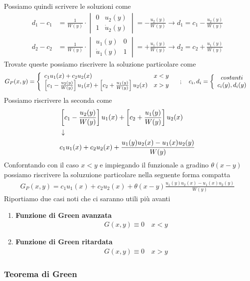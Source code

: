 Possiamo quindi scrivere le soluzioni come
\begin{align}
	d_1 - c_1 &= \frac{1}{W(y)} \cdot \begin{vmatrix}
		0 & u_2(y) \\
		1 & \dot{u}_2(y)
	\end{vmatrix} = -\frac{u_2(y)}{W(y)} \to d_1 = c_1  -\frac{u_2(y)}{W(y)}\\
	d_2 - c_2 &= \frac{1}{W(y)} \cdot \begin{vmatrix}
		u_1(y) & 0\\
		\dot{u}_1(y) & 1
	\end{vmatrix} = +\frac{u_1(y)}{W(y)} \to d_2 = c_2 +\frac{u_1(y)}{W(y)}
\end{align}
Trovate queste possiamo riscrivere la soluzione particolare come
\begin{align}
	G_P(x,y) = \double{c_1 u_1 (x) + c_2 u_2 (x) \hfill x<y}{\left[  c_1  -\frac{u_2(y)}{W(y)} \right] u_1 (x) + \left[ c_2 +\frac{u_1(y)}{W(y)} \right] u_2 (x) \quad x>y} \spacer c_i,d_i = \double{costanti}{c_i(y), d_i(y)}
\end{align}
Possiamo riscrivere la seconda come
\begin{align}
	&\left[  c_1  -\frac{u_2(y)}{W(y)} \right] u_1 (x) + \left[ c_2 +\frac{u_1(y)}{W(y)} \right] u_2 (x)\\ &\downarrow \nonumber \\
	&c_1 u_1 (x) + c_2 u_2 (x) + \frac{u_1(y)u_2(x) - u_1(x)u_2(y)}{W(y)}
\end{align}
Conforntando con il caso $x<y$ e impiegando il funzionale a gradino $\theta(x-y)$ possiamo riscrivere la soluzuione particolare nella seguente forma compatta
\begin{align}
	G_P(x,y)= c_1 u_1 (x) + c_2 u_2 (x) + \theta(x-y) \frac{u_1(y)u_2(x) - u_1(x)u_2(y)}{W(y)}
\end{align}
Riportiamo due casi noti che ci saranno utili più avanti
\begin{enumerate}
	\item \textbf{Funzione di Green avanzata}
	\begin{align}
		&G(x,y) \equiv 0 \quad x<y 
	\end{align}
	\item \textbf{Funzione di Green ritardata}
	\begin{align}
		&G(x,y) \equiv 0 \quad x>y 
	\end{align}
\end{enumerate}
\newpage

\subsubsection{Teorema di Green}

